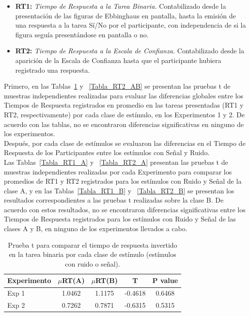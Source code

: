 \begin{itemize}
\item \textbf{RT1:} \textit{Tiempo de Respuesta a la Tarea Binaria.}  Contabilizado desde la presentación de las figuras de Ebbinghaus en pantalla, hasta la emisión de una respuesta a la tarea Sí/No por el participante, con independencia de si la figura seguía presentándose en pantalla o no.\\

\item \textbf{RT2:} \textit{Tiempo de Respuesta a la Escala de Confianza.} Contabilizado desde la aparición de la Escala de Confianza hasta que el participante hubiera registrado una respuesta.\\
\end{itemize}

Primero, en las Tablas~\ref{Tabla_RT1_AB} y ~\ref{Tabla_RT2_AB} se presentan las pruebas t de muestras independientes realizadas para evaluar las diferencias globales entre los Tiempos de Respuesta registrados en promedio en las tareas presentadas (RT1 y RT2, respectivamente) por cada clase de estímulo, en los Experimentos 1 y 2. De acuerdo con las tablas, no se encontraron diferencias significativas en ninguno de los experimentos.\\

Después, por cada clase de estímulos se evaluaron las diferencias en el Tiempo de Respuesta de los Participantes entre los estímulos con Señal y Ruido.\\

Las Tablas~\ref{Tabla_RT1_A} y ~\ref{Tabla_RT2_A} presentan las pruebas t de muestras independientes realizadas por cada Experimento para comparar los promedios de RT1 y RT2 registrados para los estímulos con Ruido y Señal de la clase A, y en las Tablas~\ref{Tabla_RT1_B} y ~\ref{Tabla_RT2_B} se presentan los resultados correspondientes a las pruebas t realizadas sobre la clase B. De acuerdo con estos resultados, no se encontraron diferencias significativas entre los Tiempos de Respuesta registrados para los estímulos con Ruido y Señal de las clases A y B, en ninguno de los experimentos llevados a cabo.\\



\begin{table}
\caption[Prueba t para comparar el tiempo de respuesta invertido en la tarea binaria por cada clase de estímulo (estímulos con ruido o señal)]{Prueba t para comparar el tiempo de respuesta invertido en la tarea binaria por cada clase de estímulo (estímulos con ruido o señal).}
\label{Tabla_RT1_AB}
\centering
\begin{tabular}{l |  c c c c}
\toprule
\textbf{Experimento} & \textbf{$\mu$RT(A)} & \textbf{$\mu$RT(B)} & \textbf{T} & \textbf{P value}\\
\midrule
Exp 1 & 1.0462 & 1.1175 & -0.4618 & 0.6468 \\
Exp 2 & 0.7262 & 0.7871 & -0.6315 & 0.5315 \\
\bottomrule
\end{tabular}
\end{table}

